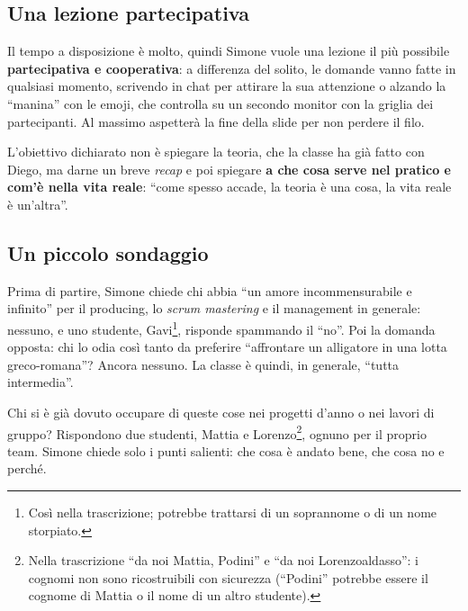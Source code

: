 \subsection{Una lezione partecipativa}

Il tempo a disposizione è molto, quindi Simone vuole una lezione il più
possibile \textbf{partecipativa e cooperativa}: a differenza del solito, le
domande vanno fatte in qualsiasi momento, scrivendo in chat per attirare la
sua attenzione o alzando la ``manina'' con le emoji, che controlla su un
secondo monitor con la griglia dei partecipanti. Al massimo aspetterà la fine
della slide per non perdere il filo.

L'obiettivo dichiarato non è spiegare la teoria, che la classe ha già fatto
con Diego, ma darne un breve \emph{recap} e poi spiegare \textbf{a che cosa
serve nel pratico e com'è nella vita reale}: ``come spesso accade, la teoria
è una cosa, la vita reale è un'altra''.

\subsection{Un piccolo sondaggio}

Prima di partire, Simone chiede chi abbia ``un amore incommensurabile e
infinito'' per il producing, lo \emph{scrum mastering} e il management in
generale: nessuno, e uno studente, Gavi\footnote{Così nella trascrizione;
potrebbe trattarsi di un soprannome o di un nome storpiato.}, risponde
spammando il ``no''. Poi la domanda opposta: chi lo odia così tanto da
preferire ``affrontare un alligatore in una lotta greco-romana''? Ancora
nessuno. La classe è quindi, in generale, ``tutta intermedia''.

Chi si è già dovuto occupare di queste cose nei progetti d'anno o nei lavori
di gruppo? Rispondono due studenti, Mattia e Lorenzo\footnote{Nella
trascrizione ``da noi Mattia, Podini'' e ``da noi Lorenzoaldasso'': i cognomi
non sono ricostruibili con sicurezza (``Podini'' potrebbe essere il cognome
di Mattia o il nome di un altro studente).}, ognuno per il proprio team.
Simone chiede solo i punti salienti: che cosa è andato bene, che cosa no e
perché.

